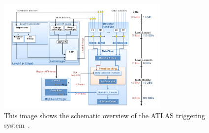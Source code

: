 \begin{figure}[!htb]
    \begin{center}
        \includegraphics[width=0.75\textwidth]{figures/chapter_ATLAS/TDAQ}
        \caption{
            This image shows the schematic overview of the ATLAS triggering system~\cite{Pequenao:1095929}.
        }
        \label{fig:TDAQ}
    \end{center}
\end{figure}

